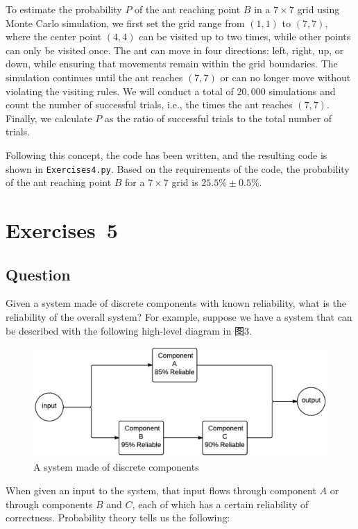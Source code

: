 \documentclass[a4paper, utf8]{ctexart}
\begin{document}
	To estimate the probability $P$ of the ant reaching point $B$ in a $7 \times 7$ grid using Monte Carlo simulation, we first set the grid range from $(1, 1)$ to $(7, 7)$, where the center point $(4, 4)$ can be visited up to two times, while other points can only be visited once. The ant can move in four directions: left, right, up, or down, while ensuring that movements remain within the grid boundaries. The simulation continues until the ant reaches $(7, 7)$ or can no longer move without violating the visiting rules. We will conduct a total of $20,000$ simulations and count the number of successful trials, i.e., the times the ant reaches $(7, 7)$. Finally, we calculate $P$ as the ratio of successful trials to the total number of trials.
	
	Following this concept, the code has been written, and the resulting code is shown in \verb|Exercises4.py|. Based on the requirements of the code, the probability of the ant reaching point $B$ for a $7 \times 7$ grid is $25.5\% \pm 0.5\%$.
	
	\section{Exercises\ 5}
	
	\subsection{Question}
	
	Given a system made of discrete components with known reliability, what is the reliability of the overall system? For example, suppose we have a system that can be described with the following high-level diagram in 图3.
	
	\begin{figure}[htbp]
		\centering
		\includegraphics[width=.75\textwidth]{./figure/figure3.png}
		\caption{A system made of discrete components}
	\end{figure}
	
	When given an input to the system, that input flows through component $A$ or through components $B$ and $C$, each of which has a certain reliability of correctness. Probability theory tells us the following:
	
\end{document}
